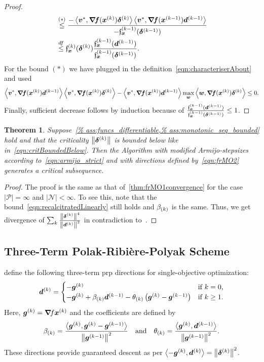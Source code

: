 \documentclass{article}
\theoremstyle{plain}
\newtheorem{theorem}{Theorem}
\theoremstyle{definition}
\begin{document}
\begin{proof}
\begin{align*}
		&\stackrel{(*)}\leq
		\frac{-
		\left\langle \bm{v}^*, \bm{\nabla}\!\bm{f}(\bm{x}^{(k)})\bm{\delta}^{(k)} \right\rangle
		\left\langle \bm{v}^*, \bm{\nabla}\!\bm{f}(\bm{x}^{(k-1)})\bm{d}^{(k-1)} \right\rangle
		}{
			-\mathfrak{f}_{\bm{x}}^{(k-1)}(\bm{\delta}^{(k-1)})
		}
		\\
		&\stackrel{df}\leq
		\mathfrak{f}_{\bm{x}}^{(k)}(\bm{\delta}^{(k)})
		\frac{
			\mathfrak{f}_{\bm{x}}^{(k-1)}(\bm{d}^{(k-1)})
		}{
			\mathfrak{f}_{\bm{x}}^{(k-1)}(\bm{\delta}^{(k-1)})
		}
		.
	\end{align*}
	For the bound $(*)$ we have plugged in the 
	definition~\eqref{eqn:characteriserAbout} and used
	$$
	\left\langle \bm{v}^*, \bm{\nabla}\!\bm{f}(\bm{x}^{(k)})\bm{d}^{(k-1)} \right\rangle
	\left\langle \bm{v}^*, \bm{\nabla}\!\bm{f}(\bm{x}^{(k)})\bm{\delta}^{(k)} \right\rangle
	-
	\left\langle \bm{v}^*, \bm{\nabla}\!\bm{f}(\bm{x}^{(k)})\bm{d}^{(k-1)} \right\rangle
	\max_{\bm{w}}\left\langle \bm{w}, \bm{\nabla}\!\bm{f}(\bm{x}^{(k)})\bm{\delta}^{(k)} \right\rangle
	\leq 0.
	$$
	Finally, sufficient decrease follows by induction
	because of $\frac{\mathfrak{f}_{\bm{x}}^{(k-1)}(\bm{d}^{(k-1)})}{\mathfrak{f}_{\bm{x}}^{(k-1)}(\bm{\delta}^{(k-1)})}\leq 1$.
\end{proof}

\begin{theorem}
	Suppose~\cref{%
	ass:funcs_differentiable,%
	ass:monotonic_seq_bounded}
	hold and that the criticality $\left\|\bm{\delta}^{(k)}\right\|$ is 
	bounded below like in~\eqref{eqn:critBoundedBelow}.
	Then the Algorithm with modified Armijo-stepsizes
	according to~\eqref{eqn:armijo_strict} and with directions defined
	by~\eqref{eqn:frMO2} generates a critical subsequence.
\end{theorem}

\begin{proof}
	The proof is the same as 
	that of~\cref{thm:frMO1convergence} for 
	the case $|\mathcal P|= \infty$ and $|\mathcal N|<\infty$.
	To see this, note that the bound~\eqref{eqn:recalcitratedLinearly}
	still holds and $\beta_{(k)}$ is the same.
	Thus, we get divergence of $\sum_{k} \frac{\left\|\bm{\delta}^{(k)}\right\|^4}{\left\|\bm{d}^{(k)}\right\|^2}$
	in contradiction to~.	
\end{proof}

\subsection{Three-Term Polak-Ribière-Polyak Scheme}
\citet{zhangDescentModifiedPolak2006}
define the following three-term \ac{prp} directions for 
single-objective optimization:
$$
\bm{d}^{(k)} 
= 
\begin{cases}
	-\bm{g}^{(k)}
		&\text{if $k=0$,}
	\\
	-\bm{g}^{(k)}
	+ \beta_{(k)}
	\bm{d}^{(k-1)}
	- \theta_{(k)}
	\left(
		\bm{g}^{(k)} - \bm{g}^{(k-1)}
		\right)
	&\text{if $k\geq1 $.}
\end{cases}
$$
Here, $\bm{g}^{(k)} = \bm{\nabla}\!f{\bm{x}^{(k)}}$ and the coefficients are defined by
\begin{equation*}
	\beta_{(k)} = 
	\frac{
		\left\langle \bm{g}^{(k)}, \bm{g}^{(k)}-\bm{g}^{(k-1)} \right\rangle
	}{
		\left\|\bm{g}^{(k-1)}\right\|^2
	}
	\quad\text{and}\quad
	\theta_{(k)}
	=
	\frac{
		\left\langle \bm{g}^{(k)}, \bm{d}^{(k-1)} \right\rangle
	}
	{
		\left\|\bm{g}^{(k-1)}\right\|^2
	}.
\end{equation*}
These directions provide guaranteed descent as per
$\left\langle -\bm{g}^{(k)}, \bm{d}^{(k)} \right\rangle = \left\|\bm{\delta}^{(k)}\right\|^2$.
\end{document}
